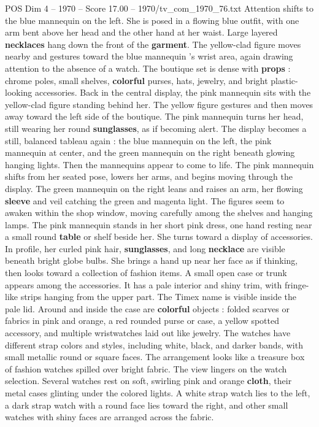 \begin{textsample}{POS Dim 4 – 1970 – Score 17.00 – 1970/tv\_com\_1970\_76.txt}
Attention shifts to the blue mannequin on the left.
She is posed in a flowing blue outfit, with one arm bent above her head and the other hand at her waist.
Large layered \textbf{necklaces} hang down the front of the \textbf{garment}.
The yellow-clad figure moves nearby and gestures toward the blue mannequin ’s wrist area, again drawing attention to the absence of a watch.
The boutique set is dense with \textbf{props} : chrome poles, small shelves, \textbf{colorful} purses, hats, jewelry, and bright plastic-looking accessories.
Back in the central display, the pink mannequin sits with the yellow-clad figure standing behind her.
The yellow figure gestures and then moves away toward the left side of the boutique.
The pink mannequin turns her head, still wearing her round \textbf{sunglasses}, as if becoming alert.
The display becomes a still, balanced tableau again : the blue mannequin on the left, the pink mannequin at center, and the green mannequin on the right beneath glowing hanging lights.
Then the mannequins appear to come to life.
The pink mannequin shifts from her seated pose, lowers her arms, and begins moving through the display.
The green mannequin on the right leans and raises an arm, her flowing \textbf{sleeve} and veil catching the green and magenta light.
The figures seem to awaken within the shop window, moving carefully among the shelves and hanging lamps.
The pink mannequin stands in her short pink dress, one hand resting near a small round \textbf{table} or shelf beside her.
She turns toward a display of accessories.
In profile, her curled pink hair, \textbf{sunglasses}, and long \textbf{necklace} are visible beneath bright globe bulbs.
She brings a hand up near her face as if thinking, then looks toward a collection of fashion items.
A small open case or trunk appears among the accessories.
It has a pale interior and shiny trim, with fringe-like strips hanging from the upper part.
The Timex name is visible inside the pale lid.
Around and inside the case are \textbf{colorful} objects : folded scarves or fabrics in pink and orange, a red rounded purse or case, a yellow spotted accessory, and multiple wristwatches laid out like jewelry.
The watches have different strap colors and styles, including white, black, and darker bands, with small metallic round or square faces.
The arrangement looks like a treasure box of fashion watches spilled over bright fabric.
The view lingers on the watch selection.
Several watches rest on soft, swirling pink and orange \textbf{cloth}, their metal cases glinting under the colored lights.
A white strap watch lies to the left, a dark strap watch with a round face lies toward the right, and other small watches with shiny faces are arranged across the fabric.

\end{textsample}
